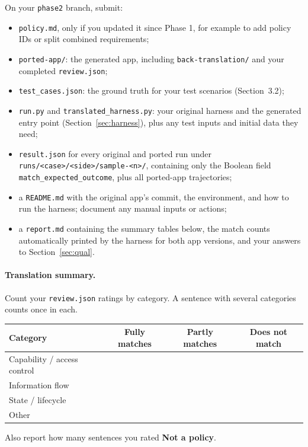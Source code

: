 \documentclass[10pt,letterpaper]{article}
\begin{document}
On your \texttt{phase2} branch, submit:
\begin{itemize}
\item \texttt{policy.md}, only if you updated it since Phase 1, for example to
add policy IDs or split combined requirements;
\item \texttt{ported-app/}: the generated app, including
\texttt{back-translation/} and your completed \texttt{review.json};
\item \texttt{test\_cases.json}: the ground truth for your test scenarios
(Section~3.2);
\item \texttt{run.py} and \texttt{translated\_harness.py}: your original harness
and the generated entry point (Section~\ref{sec:harness}), plus any test inputs
and initial data they need;
\item \texttt{result.json} for every original and ported run under
\texttt{runs/<case>/<side>/sample-<n>/}, containing only the Boolean field
\texttt{match\_expected\_outcome}, plus all ported-app trajectories;
\item a \texttt{README.md} with the original app's commit, the environment, and
how to run the harness; document any manual inputs or actions;
\item a \texttt{report.md} containing the summary tables below, the match
counts automatically printed by the harness for both app versions, and your
answers to Section~\ref{sec:qual}.
\end{itemize}

\paragraph{Translation summary.} Count your \texttt{review.json} ratings by
category. A sentence with several categories counts once in each.
\begin{center}
\small
\begin{tabular}{|l|c|c|c|}
\hline
\textbf{Category} & \textbf{Fully matches} & \textbf{Partly matches}
& \textbf{Does not match} \\
\hline
Capability / access control & & & \\
Information flow & & & \\
State / lifecycle & & & \\
Other & & & \\
\hline
\end{tabular}
\end{center}
Also report how many sentences you rated \textbf{Not a policy}.
\end{document}
